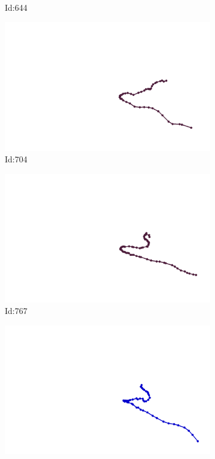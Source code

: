 \documentclass[12pt,twoside]{report}
\begin{document}
\begin{figure}
\begin{subfigure}[b]{0.20\textwidth}
\caption{Id:644}
\end{subfigure}
\begin{subfigure}[b]{0.20\textwidth}
\centering
\includegraphics[width=\textwidth]{../../trajectories/704.png}
\caption{Id:704}
\end{subfigure}
\begin{subfigure}[b]{0.20\textwidth}
\centering
\includegraphics[width=\textwidth]{../../trajectories/767.png}
\caption{Id:767}
\end{subfigure}
\begin{subfigure}[b]{0.20\textwidth}
\centering
\includegraphics[width=\textwidth]{../../trajectories/777.png}

\end{subfigure}
\end{figure}
\end{document}

